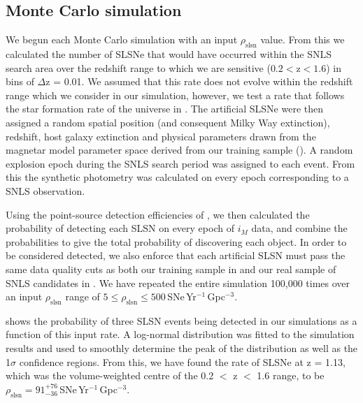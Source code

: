 \subsection{Monte Carlo simulation}
\label{sec:rate-calculation}
We begun each Monte Carlo simulation with an input $\rho_{\mathrm{slsn}}$ value. From this we calculated the number of SLSNe that would have occurred within the SNLS search area over the redshift range to which we are sensitive ($0.2<\mathrm{z}<1.6$) in bins of $\Delta$z = 0.01. We assumed that this rate does not evolve within the redshift range which we consider in our simulation, however, we test a rate that follows the star formation rate of the universe in . The artificial SLSNe were then assigned a random spatial position (and consequent Milky Way extinction), redshift, host galaxy extinction and physical parameters drawn from the magnetar model parameter space derived from our training sample (). A random explosion epoch during the SNLS search period was assigned to each event. From this the synthetic photometry was calculated on every epoch corresponding to a SNLS observation.

Using the point-source detection efficiencies of \cite{Perrett2010}, we then calculated the probability of detecting each SLSN on every epoch of $i_M$ data, and combine the probabilities to give the total probability of discovering each object. In order to be considered detected, we also enforce that each artificial SLSN must pass the same data quality cuts as both our training sample in  and our real sample of SNLS candidates in . We have repeated the entire simulation 100,000 times over an input $\rho_{\mathrm{slsn}}$ range of $5 \leq \rho_{\mathrm{slsn}} \leq 500$\,SNe\,Yr$^{-1}$\,Gpc$^{-3}$.

 shows the probability of three SLSN events being detected in our simulations as a function of this input rate. A log-normal distribution was fitted to the simulation results and used to smoothly determine the peak of the distribution as well as the 1$\sigma$ confidence regions. From this, we have found the rate of SLSNe at z = 1.13, which was the volume-weighted centre of the 0.2 $<$ z $<$ 1.6 range, to be $\rho_{\mathrm{slsn}} = 91^{+76}_{-36}$\,SNe\,Yr$^{-1}$\,Gpc$^{-3}$.

